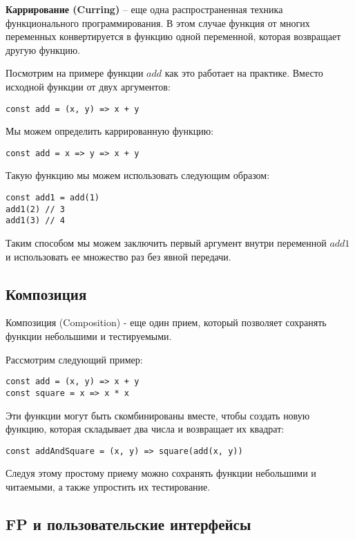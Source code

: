 \textbf{Каррирование (Curring)} -- еще одна распространенная техника функционального программирования. В этом случае функция от многих переменных конвертируется в функцию одной переменной, которая возвращает другую функцию.

Посмотрим на примере функции $add$ как это работает на практике. Вместо исходной функции от двух аргументов:

\begin{lstlisting}
const add = (x, y) => x + y
\end{lstlisting}

Мы можем определить каррированную функцию:

\begin{lstlisting}
const add = x => y => x + y
\end{lstlisting}

Такую функцию мы можем использовать следующим образом:

\begin{lstlisting}
const add1 = add(1)
add1(2) // 3
add1(3) // 4
\end{lstlisting}

Таким способом мы можем заключить первый аргумент внутри переменной $add1$ и использовать ее множество раз без явной передачи.

\subsection{Композиция}

Композиция (Composition) - еще один прием, который позволяет сохранять функции небольшими и тестируемыми.

Рассмотрим следующий пример:

\begin{lstlisting}
const add = (x, y) => x + y
const square = x => x * x
\end{lstlisting}

Эти функции могут быть скомбинированы вместе, чтобы создать новую функцию, которая складывает два числа и возвращает их квадрат:

\begin{lstlisting}
const addAndSquare = (x, y) => square(add(x, y))
\end{lstlisting}

Следуя этому простому приему можно сохранять функции небольшими и читаемыми, а также упростить их тестирование.



\subsection{FP и пользовательские интерфейсы}


